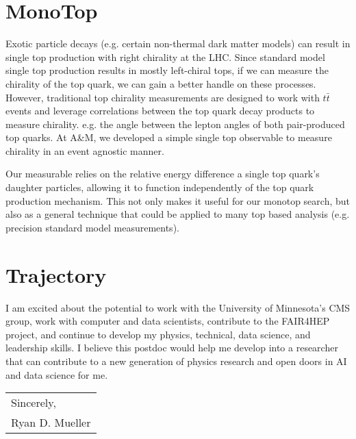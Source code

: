 \documentclass[11pt]{article}
\begin{document}
 
 \section{MonoTop}
 
 Exotic particle decays (e.g. certain non-thermal dark matter models) can result in single top production with right chirality at the LHC. Since standard model single top production results in mostly left-chiral tops, if we can measure the chirality of the top quark, we can gain a better handle on these processes. However, traditional top chirality measurements are designed to work with $t\bar{t}$ events and leverage correlations between the top quark decay products to measure chirality. e.g. the angle between the lepton angles of both pair-produced top quarks. At A\&M, we developed a simple single top observable to measure chirality in an event agnostic manner.
 
Our measurable relies on the relative energy difference a single top quark's daughter particles, allowing it to function independently of the top quark production mechanism. This not only makes it useful for our monotop search, but also as a general technique that could be applied to many top based analysis (e.g. precision standard model measurements). 

\section{Trajectory}


I am excited about the potential to work with the University of Minnesota's CMS group, work with computer and data scientists, contribute to the FAIR4HEP project, and continue to develop my physics, technical, data science, and leadership skills. I believe this postdoc would help me develop into a researcher that can contribute to a new generation of physics research and open doors in AI and data science for me. 



\bigskip

\begin{tabular}{@{}l@{}}
Sincerely, \\
  [.4em]
  Ryan D. Mueller
\end{tabular}


\medskip

\printbibliography
\end{document}

